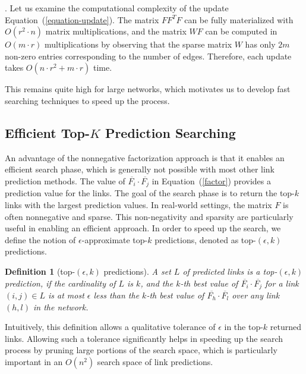 \documentclass[10pt,journal,compsoc]{IEEEtran}
\newcommand{\stitle}[1]{\vspace{0.5ex}\noindent{\bf #1}}
\newtheorem{definition}{Definition}
\begin{document}
\stitle{Discussions}. Let us examine the computational complexity of
the update Equation~(\ref{equation-update}).
The matrix $F F^T F$  can be fully materialized  with
$O(r^2 \cdot n)$ matrix multiplications, and the matrix $W F$ can be
computed in $O(m \cdot r)$ multiplications  by observing that the
sparse matrix $W$ has only $2m$ non-zero entries corresponding to the
number of edges. Therefore, each update takes $O(n
\cdot r^2 +m\cdot r )$ time.

This remains quite high for large networks, which motivates us to develop fast searching techniques to speed up the process.


\subsection{Efficient Top-$K$ Prediction Searching}
\label{sec-NMF-topk}

An advantage of the nonnegative factorization approach is that it
enables an efficient search phase, which is generally not possible
with most other link prediction methods. The value of
$\overline{F_i} \cdot \overline{F_j}$ in Equation~(\ref{factor}) provides a prediction value
for the links. The goal of the search phase is to return the top-$k$
links with the largest prediction values. In real-world settings, the matrix $F$ is
often nonnegative and sparse. This non-negativity and sparsity are
particularly useful in enabling an efficient approach. In order to
speed up the search, we define the notion of $\epsilon$-approximate
top-$k$ predictions, denoted as top-$(\epsilon, k)$ predictions.

\begin{definition}[top-$(\epsilon, k)$ predictions]
A set $L$ of predicted links is a top-$(\epsilon, k)$ prediction, if
the cardinality of $L$ is $k$, and the $k$-th best  value of
$\overline{F_i} \cdot \overline{F_j}$ for a link $(i, j) \in L$ is
at most $\epsilon$ less than the $k$-th best value of
$\overline{F_h} \cdot \overline{F_l}$ over any link $(h , l)$ in the
network.
\end{definition}
Intuitively, this definition allows a qualitative  tolerance of
$\epsilon$ in the top-$k$ returned links. Allowing such a tolerance
significantly helps in speeding up the search process by pruning
large portions of the search space, which is particularly important
in an $O(n^2)$ search space of link predictions.
\end{document}
